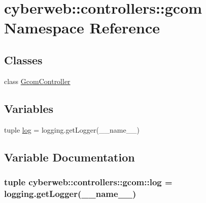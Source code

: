 \hypertarget{namespacecyberweb_1_1controllers_1_1gcom}{\section{cyberweb\-:\-:controllers\-:\-:gcom \-Namespace \-Reference}
\label{namespacecyberweb_1_1controllers_1_1gcom}
}
\subsection*{\-Classes}
\begin{DoxyCompactItemize}
\item 
class \hyperlink{classcyberweb_1_1controllers_1_1gcom_1_1_gcom_controller}{\-Gcom\-Controller}
\end{DoxyCompactItemize}
\subsection*{\-Variables}
\begin{DoxyCompactItemize}
\item 
tuple \hyperlink{namespacecyberweb_1_1controllers_1_1gcom_aa45c2b36e5e642dc5bc3dbc6092a2e69}{log} = logging.\-get\-Logger(\-\_\-\-\_\-name\-\_\-\-\_\-)
\end{DoxyCompactItemize}


\subsection{\-Variable \-Documentation}
\hypertarget{namespacecyberweb_1_1controllers_1_1gcom_aa45c2b36e5e642dc5bc3dbc6092a2e69}{
\subsubsection[{log}]{\setlength{\rightskip}{0pt plus 5cm}tuple {\bf cyberweb\-::controllers\-::gcom\-::log} = logging.\-get\-Logger(\-\_\-\-\_\-name\-\_\-\-\_\-)}}\label{namespacecyberweb_1_1controllers_1_1gcom_aa45c2b36e5e642dc5bc3dbc6092a2e69}

